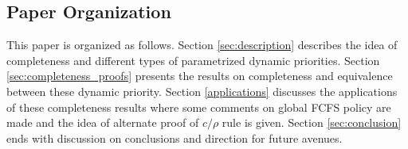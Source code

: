\documentclass[letterpaper, 10 pt, conference]{ieeeconf}  %
\begin{document}


\subsection{Paper Organization}
This paper is organized as follows. Section \ref{sec:description} describes the idea of completeness and different types of parametrized dynamic priorities. Section \ref{sec:completeness_proofs} presents the results on completeness and equivalence between these dynamic priority. Section \ref{applications} discusses the applications of these completeness results where some comments on global FCFS policy are made and the idea of alternate proof of $c/\rho$ rule is given. Section \ref{sec:conclusion} ends with discussion on conclusions and direction for future avenues.


\end{document}
